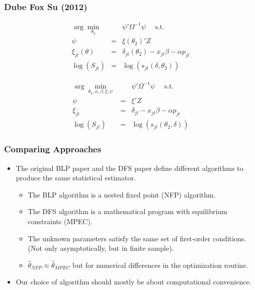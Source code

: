 \documentclass[aspectratio=169,11pt]{beamer}
\begin{document}
 \begin{frame}\frametitle{Dube Fox Su (2012)}
\footnotesize
\begin{eqnarray}
\label{blpnfxp}
\nonumber \arg \min_{\theta_2} && \psi' \Omega^{-1} \psi \quad \mbox{ s.t. } \\
\nonumber \psi &=& \xi(\theta_2)' Z\\
\xi_{jt}(\theta) &=& \delta_{jt}(\theta_2) - x_{jt} \beta - \alpha p_{jt} \\
\nonumber \log(S_{jt})  &=& \log(s_{jt}(\delta,\theta_2))
\end{eqnarray}

\begin{eqnarray}
\label{blpmpec}
\nonumber \arg \min_{\theta_2,\alpha,\beta, \xi,\psi} && \psi' \Omega^{-1}  \psi \quad \mbox{ s.t. } \\
 \psi &=& \xi' Z\\
\nonumber \xi_{jt} &=& \delta_{jt} - x_{jt} \beta - \alpha p_{jt} \\
\nonumber \log(S_{jt})  &=& \log(s_{jt}(\theta_2, \delta))
\end{eqnarray}
\end{frame}

\begin{frame}
\frametitle{Comparing Approaches}
\begin{itemize}
\item The original BLP paper and the DFS paper define different \alert{algorithms} to produce the same statistical \alert{estimator}.
\begin{itemize}
\item The BLP algorithm is a \alert{nested fixed point} (NFP) algorithm. 
\item The DFS algorithm is a \alert{mathematical program with equilibrium constraints} (MPEC).
\item The unknown parameters satisfy the same set of first-order conditions. (Not only asymptotically, but in finite sample).
\item $\hat{\theta}_{NFP} \approx \hat{\theta}_{MPEC}$ but for numerical differences in the optimization routine.
\end{itemize}
\item Our choice of algorithm should mostly be about computational convenience.
\end{itemize}
\end{frame}
\end{document}
